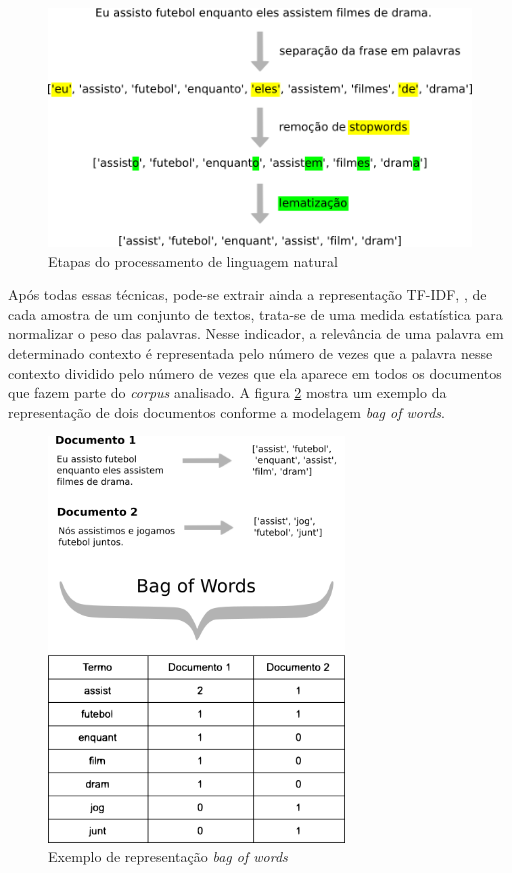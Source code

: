 \begin{figure}[!ht]
	\centering
	\includegraphics[width=1\textwidth]{figures/nltp_example.png}
	\caption{Etapas do processamento de linguagem natural}
	\label{fig:nl_ex}
\end{figure}

Após todas essas técnicas, pode-se extrair ainda a representação TF-IDF, \cite{InformationRetrievalBookChapter6}, de cada amostra de um conjunto de textos, trata-se de uma medida estatística para normalizar o peso das palavras. Nesse indicador, a relevância de uma palavra em determinado contexto é representada pelo número de vezes que a palavra nesse contexto dividido pelo número de vezes que ela aparece em todos os documentos que fazem parte do \textit{corpus} analisado. A figura \ref{fig:bow_ex} mostra um exemplo da representação de dois documentos conforme a modelagem \textit{bag of words}.


\begin{figure}[!ht]
	\centering
	\includegraphics[width=0.7\textwidth]{figures/bag_of_words_example.png}
	\caption{Exemplo de representação \textit{bag of words}}
	\label{fig:bow_ex}
\end{figure}

